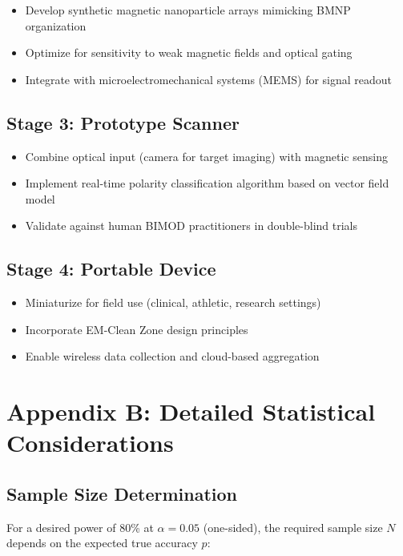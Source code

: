 \documentclass[12pt,a4paper]{article}
\begin{document}
\begin{itemize}
    \item Develop synthetic magnetic nanoparticle arrays mimicking BMNP organization
    \item Optimize for sensitivity to weak magnetic fields and optical gating
    \item Integrate with microelectromechanical systems (MEMS) for signal readout
\end{itemize}

\subsection{Stage 3: Prototype Scanner}

\begin{itemize}
    \item Combine optical input (camera for target imaging) with magnetic sensing
    \item Implement real-time polarity classification algorithm based on vector field model
    \item Validate against human BIMOD practitioners in double-blind trials
\end{itemize}

\subsection{Stage 4: Portable Device}

\begin{itemize}
    \item Miniaturize for field use (clinical, athletic, research settings)
    \item Incorporate EM-Clean Zone design principles
    \item Enable wireless data collection and cloud-based aggregation
\end{itemize}

\section{Appendix B: Detailed Statistical Considerations}

\subsection{Sample Size Determination}

For a desired power of 80\% at \(\alpha = 0.05\) (one-sided), the required sample size \(N\) depends on the expected true accuracy \(p\):
\end{document}
